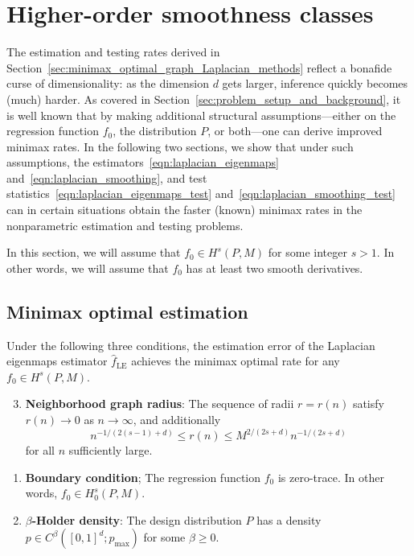 \documentclass{article}
\newcommand{\1}{\mathbf{1}}
\newcommand{\wh}[1]{\widehat{#1}}
\newcommand{\LE}{\mathrm{LE}}
\theoremstyle{alden}
\theoremstyle{aldenthm}
\theoremstyle{definition}
\theoremstyle{remark}
\begin{document}
\section{Higher-order smoothness classes}
\label{sec:higher_order_smoothness_classes}
The estimation and testing rates derived in Section~\ref{sec:minimax_optimal_graph_Laplacian_methods} reflect a bonafide curse of dimensionality: as  the dimension $d$ gets larger, inference quickly becomes (much) harder. As covered in Section~\ref{sec:problem_setup_and_background}, it is well known that by making additional structural assumptions---either on the regression function $f_0$, the distribution $P$, or both---one can derive improved minimax rates. In the following two sections, we show that under such assumptions, the estimators~\eqref{eqn:laplacian_eigenmaps} and~\eqref{eqn:laplacian_smoothing}, and test statistics~\eqref{eqn:laplacian_eigenmaps_test} and~\eqref{eqn:laplacian_smoothing_test} can in certain situations obtain the faster (known) minimax rates in the nonparametric estimation and testing problems.

In this section, we will assume that $f_0 \in H^s(P,M)$ for some integer $s > 1$. In other words, we will assume that $f_0$ has at least two smooth derivatives. 

\subsection{Minimax optimal estimation}
\label{subsec:minimax_estimation_higher_order}
Under the following three conditions, the estimation error of the Laplacian eigenmaps estimator $\wh{f}_{\LE}$ achieves the minimax optimal rate for any $f_0 \in H^s(P,M)$.
\begin{enumerate}[label=(K\arabic*)]
	\setcounter{enumi}{2}
	\item 
	\label{asmp:kernel_radius_higher_order}
	\textbf{Neighborhood graph radius}:
	The sequence of radii $r = r(n)$ satisfy $r(n) \to 0$ as $n \to \infty$, and additionally
	\begin{equation*}
	n^{-1/(2(s - 1) + d)}\leq r(n) \leq M^{2/(2s + d)}n^{-1/(2s + d)}
	\end{equation*}
	for all $n$ sufficiently large.
\end{enumerate}
\begin{enumerate}[label=(F\arabic*)]
	\setcounter{enumi}{0}
	\item 
	\label{asmp:boundary} \textbf{Boundary condition}; The regression function $f_0$ is zero-trace. In other words, $f_0 \in H_0^s(P,M)$. 
\end{enumerate}
\begin{enumerate}[label=(P\arabic*)]
	\setcounter{enumi}{1}
	\item 
	\label{asmp:smooth_density}\textbf{$\beta$-Holder density}: The design distribution $P$ has a density $p \in C^{\beta}([0,1]^d;p_{\max})$ for some $\beta \geq 0$. 
\end{enumerate}
\end{document}
